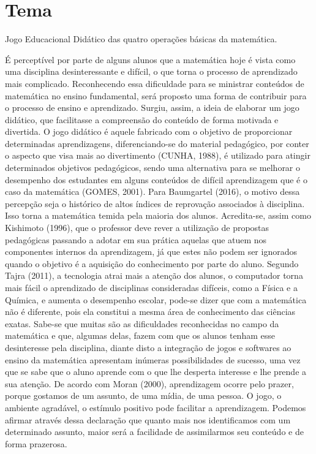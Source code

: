 \documentclass[a4paper,12pt]{article}
\begin{document}


\newpage
\tableofcontents

\newpage
\section{Tema}
Jogo Educacional Didático das quatro operações básicas da matemática.

É perceptível por parte de alguns alunos que a matemática hoje é vista como uma disciplina desinteressante e difícil, o que torna o processo de aprendizado mais complicado. Reconhecendo essa dificuldade para se ministrar conteúdos de matemática no ensino fundamental, será proposto uma forma de contribuir para o processo de ensino e aprendizado. Surgiu, assim, a ideia de elaborar um jogo didático, que facilitasse a compreensão do conteúdo de forma motivada e divertida.
	O jogo didático é aquele fabricado com o objetivo de proporcionar determinadas aprendizagens, diferenciando-se do material pedagógico, por conter o aspecto que visa mais ao divertimento (CUNHA, 1988), é utilizado para atingir determinados objetivos pedagógicos, sendo uma alternativa para se melhorar o desempenho dos estudantes em alguns conteúdos de difícil aprendizagem que é o caso da matemática (GOMES, 2001).
 	Para Baumgartel (2016), o motivo dessa percepção seja o histórico de altos índices de reprovação associados à disciplina. Isso torna a matemática temida pela maioria dos alunos. Acredita-se, assim como Kishimoto (1996), que o professor deve rever a utilização de propostas pedagógicas passando a adotar em sua prática aquelas que atuem nos componentes internos da aprendizagem, já que estes não podem ser ignorados quando o objetivo é a aquisição do conhecimento por parte do aluno.
	Segundo Tajra (2011), a tecnologia atrai mais a atenção dos alunos, o computador torna mais fácil o aprendizado de disciplinas consideradas difíceis, como a Física e a Química, e aumenta o desempenho escolar, pode-se dizer que com a matemática não é diferente, pois ela constitui a mesma área de conhecimento das ciências exatas.
	Sabe-se que muitas são as dificuldades reconhecidas no campo da matemática e que, algumas delas, fazem com que os alunos tenham esse desinteresse pela disciplina, diante disto a integração de jogos e softwares ao ensino da matemática apresentam inúmeras possibilidades de sucesso, uma vez que se sabe que o aluno aprende com o que lhe desperta interesse e lhe prende a sua atenção.
	De acordo com Moran (2000), aprendizagem ocorre pelo prazer, porque gostamos de um assunto, de uma mídia, de uma pessoa. O jogo, o ambiente agradável, o estímulo positivo pode facilitar a aprendizagem. Podemos afirmar através dessa declaração que quanto mais nos identificamos com um determinado assunto, maior será a facilidade de assimilarmos seu conteúdo e de forma prazerosa.
\end{document}
